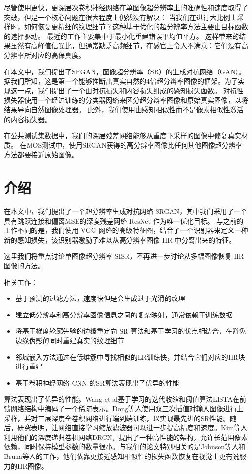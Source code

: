 \documentclass[UTF8,a4paper,10pt]{ctexart}
\begin{document}
尽管使用更快，更深层次卷积神经网络在单图像超分辨率上的准确性和速度取得了突破，但是一个核心问题在很大程度上仍然没有解决：
当我们在进行大比例上采样时，如何恢复更精细的纹理细节？这种基于优化的超分辨率方法主要由目标函数的选择驱动。
最近的工作主要集中于最小化重建错误平均值平方。
这样带来的结果虽然有高峰值信噪比，但通常缺乏高频细节，在感官上令人不满意：它们没有高分辨率所对应的高保真度。

在本文中，我们提出了SRGAN，图像超分辨率（SR）的生成对抗网络（GAN）。
据我们所知，这是第一个能够推断出真实自然的4倍超分辨率图像的框架。为了实现这一点，我们提出了一个由对抗损失和内容损失组成的感知损失函数。
对抗性损失器使用一个经过训练的分类器网络来区分超分辨率图像和原始真实图像，以将结果导向自然图像处理器。
此外，我们使用由感知相似性而不是像素相似性激活的内容损失器。

在公共测试集数据中，我们的深层残差网络能够从重度下采样的图像中修复真实材质。
在MOS测试中，使用SRGAN获得的高分辨率图像比任何其他图像超分辨率方法都要接近原始图像。

\section{介绍}
在本文中，我们提出了一个超分辨率生成对抗网络 SRGAN，其中我们采用了一个具有跳跃连接和偏离MSE的深度残差网络 ResNet 作为唯一优化目标。
与之前的工作不同的是，我们使用 VGG 网络的高级特征图，结合了一个识别器来定义一种新的感知损失，该识别器激励了难以从高分辨率图像 HR 中分离出来的特征。

这里我们将重点讨论单图像超分辨率 SISR，不再进一步讨论从多幅图像恢复 HR 图像的方法。

相关工作：
\begin{itemize}
  \item 基于预测的过滤方法，速度快但是会生成过于光滑的纹理
  \item 建立低分辨率和高分辨率图像信息之间的复杂映射，通常依赖于训练数据
  \item 将基于梯度轮廓先验的边缘重定向 SR 算法和基于学习的优点相结合，在避免边缘伪影的同时重建真实的纹理细节
  \item 邻域嵌入方法通过在低维簇中寻找相似的LR训练快，并结合它们对应的HR块进行重建
  \item 基于卷积神经网络 CNN 的SR算法表现出了优异的性能
\end{itemize}

算法表现出了优异的性能。Wang et al基于学习的迭代收缩和阈值算法LISTA在前馈网络结构中编码了一个稀疏表示。Dong等人使用双三次插值对输入图像进行上采样，并对三层深度全卷积网络进行端到端训练，以实现最先进的SR性能。随后，研究表明，让网络直接学习缩放滤波器可以进一步提高精度和速度。Kim等人利用他们的深度递归卷枳网络DRCN，提出了一种高性能的架构，允许长范围像素依赖，同时保持模型参数的数量很小。与我们的论文特别相关的是Johnson等人和Bruna等人的工作，他们依靠更接近感知相似性的损失函数恢复在视觉上更有说服力的HR图像。
\end{document}

